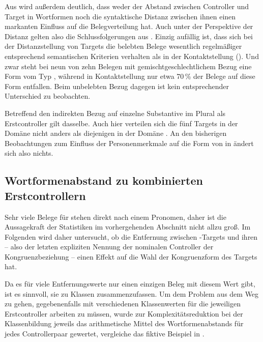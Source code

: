 Aus  wird außerdem deutlich, dass weder der Abstand
zwischen Controller und Target in Wortformen noch die syntaktische Distanz
zwischen ihnen einen markanten Einfluss auf die Belegverteilung hat. Auch unter
der Perspektive der Distanz gelten also die Schlussfolgerungen aus
. Einzig aufällig ist, dass sich bei der
Distanzstellung von Targets die belebten Belege wesentlich regelmäßiger
entsprechend semantischen Kriterien verhalten als in der Kontaktstellung
(). Und zwar steht bei neun von zehn Belegen mit
gemischtgeschlechtlichem Bezug eine Form vom Typ , während in
Kontaktstellung nur etwa 70\,\% der Belege auf diese Form entfallen. Beim
unbelebten Bezug dagegen ist kein entsprechender Unterschied zu beobachten.

Betreffend den indirekten Bezug auf einzelne Substantive im Plural als
Erstcontroller gilt dasselbe. Auch hier verteilen sich die fünf Targets in der
Domäne  nicht anders als diejenigen in der Domäne
. An den bisherigen Beobachtungen zum
Einfluss der Personenmerkmale auf die Form von  in
 ändert sich also nichts.

\subsection{Wortformenabstand zu kombinierten Erstcontrollern}

Sehr viele Belege für  stehen direkt nach einem Pronomen, daher ist
die Aussagekraft der Statistiken im vorhergehenden Abschnitt nicht allzu groß.
Im Folgenden wird daher untersucht, ob die Entfernung zwischen
-Targets und ihren  -- also der letzten
expliziten Nennung der nominalen Controller der Kongruenzbeziehung -- einen
Effekt auf die Wahl der Kongruenzform des Targets hat.

Da es für viele Entfernungswerte nur einen einzigen Beleg mit diesem Wert gibt,
ist es sinnvoll, sie zu Klassen zusammenzufassen. Um dem Problem aus dem Weg zu
gehen, gegebenenfalls mit verschiedenen Klassenwerten für die jeweiligen
Erstcontroller arbeiten zu müssen, wurde zur Komplexitätsreduktion bei der
Klassenbildung jeweils das arithmetische Mittel des Wortformenabstands für
jedes Controllerpaar gewertet, vergleiche das fiktive Beispiel in
.

